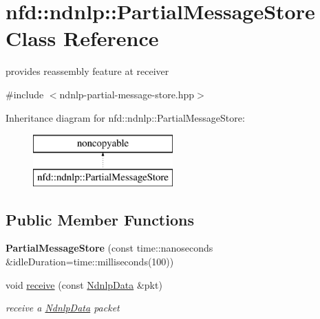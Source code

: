 \hypertarget{classnfd_1_1ndnlp_1_1PartialMessageStore}{}\section{nfd\+:\+:ndnlp\+:\+:Partial\+Message\+Store Class Reference}
\label{classnfd_1_1ndnlp_1_1PartialMessageStore}


provides reassembly feature at receiver  




{\ttfamily \#include $<$ndnlp-\/partial-\/message-\/store.\+hpp$>$}

Inheritance diagram for nfd\+:\+:ndnlp\+:\+:Partial\+Message\+Store\+:\begin{figure}[H]
\begin{center}
\leavevmode
\includegraphics[height=2.000000cm]{classnfd_1_1ndnlp_1_1PartialMessageStore}
\end{center}
\end{figure}
\subsection*{Public Member Functions}
\begin{DoxyCompactItemize}
\item 
{\bfseries Partial\+Message\+Store} (const time\+::nanoseconds \&idle\+Duration=time\+::milliseconds(100))\hypertarget{classnfd_1_1ndnlp_1_1PartialMessageStore_a99a9e33454433305550e6a5d6789882d}{}\label{classnfd_1_1ndnlp_1_1PartialMessageStore_a99a9e33454433305550e6a5d6789882d}

\item 
void \hyperlink{classnfd_1_1ndnlp_1_1PartialMessageStore_a1c70b08d4038c71669947e762459b154}{receive} (const \hyperlink{classnfd_1_1ndnlp_1_1NdnlpData}{Ndnlp\+Data} \&pkt)
\begin{DoxyCompactList}\small\item\em receive a \hyperlink{classnfd_1_1ndnlp_1_1NdnlpData}{Ndnlp\+Data} packet \end{DoxyCompactList}\end{DoxyCompactItemize}
